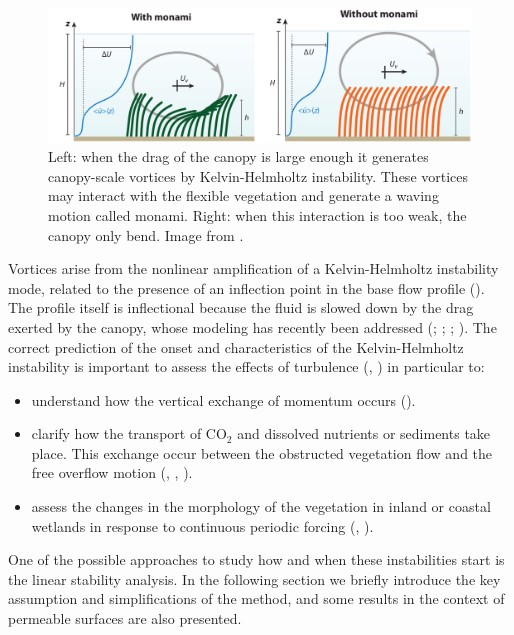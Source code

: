 \begin{figure}[h]
	\centering
	\includegraphics[width=1\linewidth]{chapter_1/monami}
	\caption{Left: when the drag of the canopy is large enough it generates canopy-scale vortices by Kelvin-Helmholtz instability. These vortices may interact with the flexible vegetation and generate a waving motion called monami. Right: when this interaction is too weak, the canopy only bend. Image from \citet{nepf2012flow}.}
	\label{fig:monami}
\end{figure}

Vortices arise from the nonlinear amplification of a Kelvin-Helmholtz instability mode, related to the presence of an inflection point in the base flow profile (\citet{asaeda2005morphological}). The profile itself is inflectional because the fluid is slowed down by the drag exerted by the canopy, whose modeling has recently been addressed (\citet{py2004mixing}; \citet{singh2016linear};  \citet{zampogna2016instability}; \citet{tilton2008linear}).
The correct prediction of the onset and characteristics of the Kelvin-Helmholtz instability is important to assess the effects of turbulence (\citet{finnigan2000turbulence}, \citet{jimenez2001turbulent}) in particular to:

\begin{itemize}
	\item understand how the vertical exchange of momentum occurs (\citet{ikeda1996three}).
	\item clarify how the transport of $\text{CO}_2$ and dissolved nutrients or sediments take place. This exchange occur between the
	obstructed vegetation flow and the free overflow motion (\citet{gambi1990flume}, \citet{eckman1987role}, \citet{grizzle1996hydrodynamically}).
	\item assess the changes in the morphology of the vegetation in inland or coastal wetlands in
	response to continuous periodic forcing (\citet{asaeda2005morphological}, \citet{patil2010characteristics}).
\end{itemize}

One of the possible approaches to study how and when these instabilities start is the linear stability analysis. In the following section we briefly introduce the key assumption and simplifications of the method, and some results in the context of permeable surfaces are also presented.


